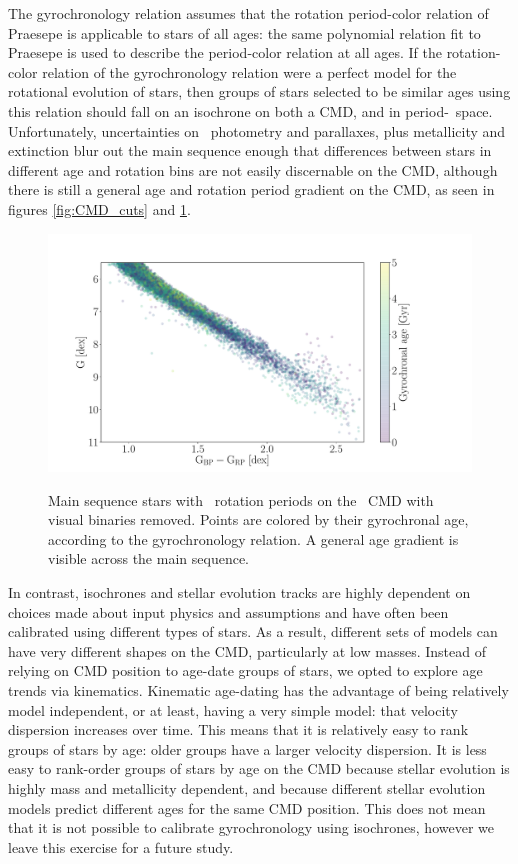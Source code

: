 The \citet{angus2019} gyrochronology relation assumes that the rotation
period-color relation of Praesepe is applicable to stars of all ages: the same
polynomial relation fit to Praesepe is used to describe the period-color
relation at all ages.
If the rotation-color relation of the \citet{angus2019} gyrochronology
relation were a perfect model for the rotational evolution of stars, then
groups of stars selected to be similar ages using this relation should fall on
an isochrone on both a CMD, and in period-\teff\ space.
Unfortunately, uncertainties on \gaia\ photometry and parallaxes, plus
metallicity and extinction blur out the main sequence enough that differences
between stars in different age and rotation bins are not easily discernable on
the CMD, although there is still a general age and rotation period gradient on
the CMD, as seen in figures \ref{fig:CMD_cuts} and \ref{fig:age_gradient}.
\begin{figure}
  \caption{
Main sequence stars with \mct\ rotation periods on the \gaia\ CMD with visual
    binaries removed.
    Points are colored by their gyrochronal age, according to the
    \citet{angus2019} gyrochronology relation.
    A general age gradient is visible across the main sequence.
}
  \centering
    \includegraphics[width=1\textwidth]{age_gradient}
\label{fig:age_gradient}
\end{figure}
In contrast, isochrones and stellar evolution tracks are highly dependent on
choices made about input physics and assumptions and have often been
calibrated using different types of stars.
As a result, different sets of models can have very different shapes on the
CMD, particularly at low masses.
Instead of relying on CMD position to age-date groups of stars, we opted to
explore age trends via kinematics.
Kinematic age-dating has the advantage of being relatively model independent,
or at least, having a very simple model: that velocity dispersion increases
over time.
This means that it is relatively easy to rank groups of stars by age: older
groups have a larger velocity dispersion.
It is less easy to rank-order groups of stars by age on the CMD because
stellar evolution is highly mass and metallicity dependent, and because
different stellar evolution models predict different ages for the same CMD
position.
This does not mean that it is not possible to calibrate gyrochronology using
isochrones, however we leave this exercise for a future study.

